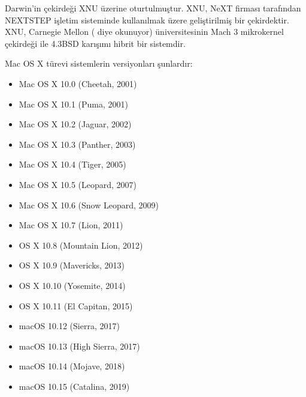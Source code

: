 \documentclass[a4paper,10pt,turkish]{sphinxmanual}
\begin{document}
\sphinxAtStartPar
Darwin’in çekirdeği XNU üzerine oturtulmuştur. XNU, NeXT firması tarafından NEXTSTEP
işletim sisteminde kullanılmak üzere geliştirilmiş bir çekirdektir. XNU, Carnegie Mellon
( diye okunuyor) üniversitesinin Mach 3 mikrokernel çekirdeği ile 4.3BSD karışımı
hibrit bir sistemdir.

\sphinxAtStartPar
Mac OS X türevi sistemlerin versiyonları şunlardır:
\begin{itemize}
\item {} 
\sphinxAtStartPar
Mac OS X 10.0 (Cheetah, 2001)

\item {} 
\sphinxAtStartPar
Mac OS X 10.1 (Puma, 2001)

\item {} 
\sphinxAtStartPar
Mac OS X 10.2 (Jaguar, 2002)

\item {} 
\sphinxAtStartPar
Mac OS X 10.3 (Panther, 2003)

\item {} 
\sphinxAtStartPar
Mac OS X 10.4 (Tiger, 2005)

\item {} 
\sphinxAtStartPar
Mac OS X 10.5 (Leopard, 2007)

\item {} 
\sphinxAtStartPar
Mac OS X 10.6 (Snow Leopard, 2009)

\item {} 
\sphinxAtStartPar
Mac OS X 10.7 (Lion, 2011)

\item {} 
\sphinxAtStartPar
OS X 10.8 (Mountain Lion, 2012)

\item {} 
\sphinxAtStartPar
OS X 10.9 (Mavericks, 2013)

\item {} 
\sphinxAtStartPar
OS X 10.10 (Yosemite, 2014)

\item {} 
\sphinxAtStartPar
OS X 10.11 (El Capitan, 2015)

\item {} 
\sphinxAtStartPar
macOS 10.12 (Sierra, 2017)

\item {} 
\sphinxAtStartPar
macOS 10.13 (High Sierra, 2017)

\item {} 
\sphinxAtStartPar
macOS 10.14 (Mojave, 2018)

\item {} 
\sphinxAtStartPar
macOS 10.15 (Catalina, 2019)


\end{itemize}
\end{document}
